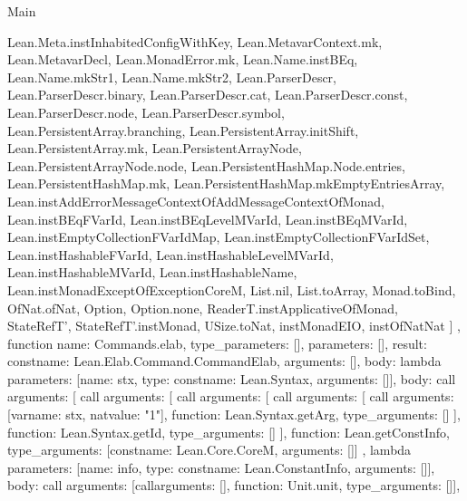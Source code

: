 \begin{lexlean}{Main}
\begin{toolingmodule}
{{        Lean.Meta.instInhabitedConfigWithKey,
        Lean.MetavarContext.mk,
        Lean.MetavarDecl,
        Lean.MonadError.mk,
        Lean.Name.instBEq,
        Lean.Name.mkStr1,
        Lean.Name.mkStr2,
        Lean.ParserDescr,
        Lean.ParserDescr.binary,
        Lean.ParserDescr.cat,
        Lean.ParserDescr.const,
        Lean.ParserDescr.node,
        Lean.ParserDescr.symbol,
        Lean.PersistentArray.branching,
        Lean.PersistentArray.initShift,
        Lean.PersistentArray.mk,
        Lean.PersistentArrayNode,
        Lean.PersistentArrayNode.node,
        Lean.PersistentHashMap.Node.entries,
        Lean.PersistentHashMap.mk,
        Lean.PersistentHashMap.mkEmptyEntriesArray,
        Lean.instAddErrorMessageContextOfAddMessageContextOfMonad,
        Lean.instBEqFVarId,
        Lean.instBEqLevelMVarId,
        Lean.instBEqMVarId,
        Lean.instEmptyCollectionFVarIdMap,
        Lean.instEmptyCollectionFVarIdSet,
        Lean.instHashableFVarId,
        Lean.instHashableLevelMVarId,
        Lean.instHashableMVarId,
        Lean.instHashableName,
        Lean.instMonadExceptOfExceptionCoreM,
        List.nil,
        List.toArray,
        Monad.toBind,
        OfNat.ofNat,
        Option,
        Option.none,
        ReaderT.instApplicativeOfMonad,
        StateRefT',
        StateRefT'.instMonad,
        USize.toNat,
        instMonadEIO,
        instOfNatNat
      ]
    },
    function{
      name: Commands.elab,
      type_parameters: [],
      parameters: [],
      result: const{name: Lean.Elab.Command.CommandElab, arguments: []},
      body: lambda{
        parameters: [{name: stx, type: const{name: Lean.Syntax, arguments: []}}],
        body: call{
          arguments: [
            call{
              arguments: [
                call{
                  arguments: [
                    call{
                      arguments: [
                        call{
                          arguments: [var{name: stx}, nat{value: "1"}],
                          function: Lean.Syntax.getArg,
                          type_arguments: []
                        }
                      ],
                      function: Lean.Syntax.getId,
                      type_arguments: []
                    }
                  ],
                  function: Lean.getConstInfo,
                  type_arguments: [const{name: Lean.Core.CoreM, arguments: []}]
                },
                lambda{
                  parameters: [{name: info, type: const{name: Lean.ConstantInfo, arguments: []}}],
                  body: call{
                    arguments: [call{arguments: [], function: Unit.unit, type_arguments: []}],
}}}}}}}
\end{toolingmodule}
\end{lexlean}
